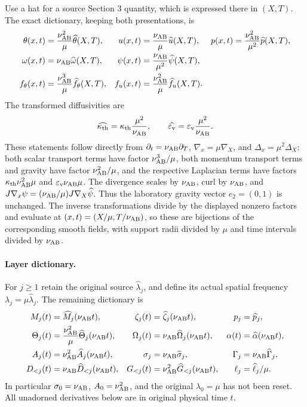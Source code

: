 Use a hat for a source Section 3 quantity, which is expressed there in $(X,T)$. The exact dictionary, keeping both presentations, is
\begin{align}
 \theta(x,t)&=\frac{\nu_{\mathrm{AB}}^2}{\mu}\widehat\theta(X,T),&
 u(x,t)&=\frac{\nu_{\mathrm{AB}}}\mu\widehat u(X,T),&
 p(x,t)&=\frac{\nu_{\mathrm{AB}}^2}{\mu^2}\widehat p(X,T),\label{pc:eq:scaling}\\
 \omega(x,t)&=\nu_{\mathrm{AB}}\widehat\omega(X,T),&
 \psi(x,t)&=\frac{\nu_{\mathrm{AB}}}{\mu^2}\widehat\psi(X,T),\nonumber\\
 f_\theta(x,t)&=\frac{\nu_{\mathrm{AB}}^3}{\mu}\widehat f_\theta(X,T),&
 f_u(x,t)&=\frac{\nu_{\mathrm{AB}}^2}{\mu}\widehat f_u(X,T).\nonumber
\end{align}
The transformed diffusivities are
\begin{equation}\label{pc:eq:scaled-diffusion}
 \widehat{\kappa_{\mathrm{th}}}=\kappa_{\mathrm{th}}\frac{\mu^2}{\nu_{\mathrm{AB}}},\qquad
 \widehat{\varepsilon_{\mathrm v}}=\varepsilon_{\mathrm v}\frac{\mu^2}{\nu_{\mathrm{AB}}}.
\end{equation}
These statements follow directly from $\partial_t=\nu_{\mathrm{AB}}\partial_T$, $\nabla_x=\mu\nabla_X$, and $\Delta_x=\mu^2\Delta_X$: both scalar transport terms have factor $\nu_{\mathrm{AB}}^3/\mu$, both momentum transport terms and gravity have factor $\nu_{\mathrm{AB}}^2/\mu$, and the respective Laplacian terms have factors $\kappa_{\mathrm{th}}\nu_{\mathrm{AB}}^2\mu$ and $\varepsilon_{\mathrm v}\nu_{\mathrm{AB}}\mu$. The divergence scales by $\nu_{\mathrm{AB}}$, curl by $\nu_{\mathrm{AB}}$, and $J\nabla_x\psi=(\nu_{\mathrm{AB}}/\mu)J\nabla_X\widehat\psi$. Thus the laboratory gravity vector $e_2=(0,1)$ is unchanged. The inverse transformations divide by the displayed nonzero factors and evaluate at $(x,t)=(X/\mu,T/\nu_{\mathrm{AB}})$, so these are bijections of the corresponding smooth fields, with support radii divided by $\mu$ and time intervals divided by $\nu_{\mathrm{AB}}$.

\paragraph{Layer dictionary.}
For $j\ge1$ retain the original source $\widehat\lambda_j$, and define its actual spatial frequency $\lambda_j=\mu\widehat\lambda_j$. The remaining dictionary is
\begin{align}
 M_j(t)&=\widehat M_j(\nu_{\mathrm{AB}}t),&\zeta_j(t)&=\widehat\zeta_j(\nu_{\mathrm{AB}}t),&p_j&=\widehat p_j,\\
 \Theta_j(t)&=\frac{\nu_{\mathrm{AB}}^2}{\mu}\widehat\Theta_j(\nu_{\mathrm{AB}}t),&
 \Omega_j(t)&=\nu_{\mathrm{AB}}\widehat\Omega_j(\nu_{\mathrm{AB}}t),&
 \alpha(t)&=\widehat\alpha(\nu_{\mathrm{AB}}t),\nonumber\\
 A_j(t)&=\nu_{\mathrm{AB}}^2\widehat A_j(\nu_{\mathrm{AB}}t),&
 \sigma_j&=\nu_{\mathrm{AB}}\widehat\sigma_j,&
 \Gamma_j&=\nu_{\mathrm{AB}}\widehat\Gamma_j,\nonumber\\
 D_{<j}(t)&=\nu_{\mathrm{AB}}\widehat D_{<j}(\nu_{\mathrm{AB}}t),&
 G_{<j}(t)&=\nu_{\mathrm{AB}}^2\widehat G_{<j}(\nu_{\mathrm{AB}}t),&
 \ell_j&=\widehat\ell_j/\mu.\nonumber
\end{align}
In particular $\sigma_0=\nu_{\mathrm{AB}}$, $A_0=\nu_{\mathrm{AB}}^2$, and the original $\lambda_0=\mu$ has not been reset. All unadorned derivatives below are in original physical time $t$.

